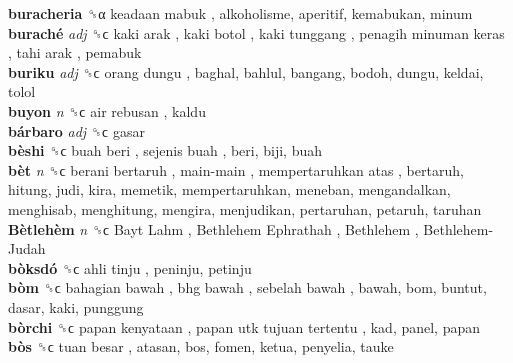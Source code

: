 \textbf{buracheria} ␝α   keadaan mabuk , alkoholisme, aperitif, kemabukan, minum  \\
\textbf{buraché} \emph{adj}  ␝ϲ   kaki arak ,  kaki botol ,  kaki tunggang ,  penagih minuman keras ,  tahi arak , pemabuk  \\
\textbf{buriku} \emph{adj}  ␝ϲ   orang dungu , baghal, bahlul, bangang, bodoh, dungu, keldai, tolol  \\
\textbf{buyon} \emph{n}  ␝ϲ   air rebusan , kaldu  \\
\textbf{bárbaro} \emph{adj}  ␝ϲ  gasar  \\
\textbf{bèshi} ␝ϲ   buah beri ,  sejenis buah , beri, biji, buah  \\
\textbf{bèt} \emph{n}  ␝ϲ   berani bertaruh ,  main-main ,  mempertaruhkan atas , bertaruh, hitung, judi, kira, memetik, mempertaruhkan, meneban, mengandalkan, menghisab, menghitung, mengira, menjudikan, pertaruhan, petaruh, taruhan  \\
\textbf{Bètlehèm} \emph{n}  ␝ϲ   Bayt Lahm ,  Bethlehem Ephrathah ,  Bethlehem ,  Bethlehem-Judah   \\
\textbf{bòksdó} ␝ϲ   ahli tinju , peninju, petinju  \\
\textbf{bòm} ␝ϲ   bahagian bawah ,  bhg bawah ,  sebelah bawah , bawah, bom, buntut, dasar, kaki, punggung  \\
\textbf{bòrchi} ␝ϲ   papan kenyataan ,  papan utk tujuan tertentu , kad, panel, papan  \\
\textbf{bòs} ␝ϲ   tuan besar , atasan, bos, fomen, ketua, penyelia, tauke  \\
